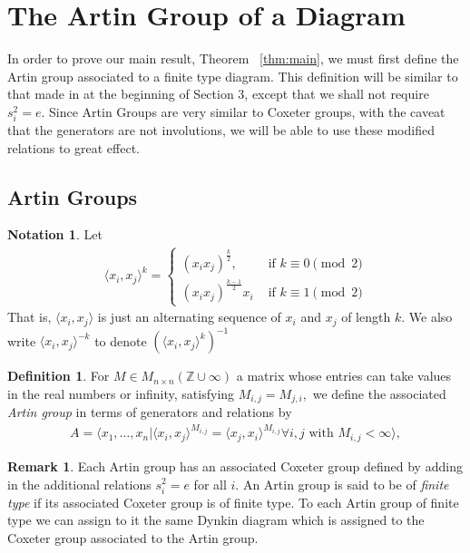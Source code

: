 \documentclass[11pt]{amsart}
\theoremstyle{definition}
\newtheorem{defn}[thm]{Definition}
\newtheorem{note}[thm]{Notation}
\newtheorem{rem}[thm]{Remark}
\begin{document}
\section{The Artin Group of a Diagram}
\label{sec:defn_artingroup}

In order to prove our main result, Theorem ~\ref{thm:main}, we must first define the Artin group associated to a finite type diagram. This definition will be similar to that made in \cite{BM13} at the beginning of Section 3, except that we shall not require $s_i^2 = e.$ Since Artin Groups are very similar to Coxeter groups, with the caveat that the generators are not involutions, we will be able to use these modified relations to great effect.

\subsection{Artin Groups}

\begin{note}
Let
\begin{align*}
\langle x_i,x_j \rangle ^k = \begin{cases}
(x_ix_j)^{\frac{k}{2}}, &\text{ if }k \equiv 0 \pmod 2\\
(x_ix_j)^{\frac{k-1}{2}}x_i &\text{ if } k \equiv 1 \pmod 2
\end{cases}
\end{align*}
That is, $\langle x_i,x_j \rangle$ is just an alternating sequence of $x_i$ and $x_j$ of length $k$.  We also write $\langle x_i,x_j\rangle^{-k}$ to denote $\left(\langle x_i,x_j\rangle^k\right)^{-1}$
\end{note}

\begin{defn}
\cite[Beginning of section 1.2]{C06}
For $M \in M_{n \times n}(\mathbb Z \cup \infty)$ a matrix whose entries can take values in the real numbers or infinity, satisfying $M_{i,j} = M_{j,i},$ we define the associated {\it Artin group} in terms of generators and relations by
\begin{align*}
A = \langle x_1,\ldots, x_n| \langle x_i,x_j \rangle^{M_{i,j}} = \langle x_j,x_i \rangle^{M_{i,j}} \forall i,j \text{ with } M_{i,j}<\infty \rangle,
\end{align*}
\end{defn}

\begin{rem}
Each Artin group has an associated Coxeter group defined by adding in the additional relations $s_i^2 = e$ for all $i.$ An Artin group is said to be of {\it finite type} if its associated Coxeter group is of finite type. To each Artin group of finite type we can assign to it the same Dynkin diagram which is assigned to the Coxeter group associated to the Artin group.
\end{rem}
\end{document}
